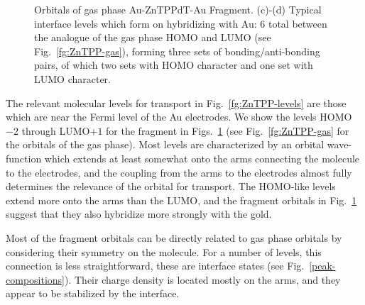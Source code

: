 \documentclass[aip,jcp,a4paper,reprint,floatfix,superscriptaddress]{revtex4-1}
\begin{document}
\begin{figure}
\caption{Orbitals of gas phase Au-ZnTPPdT-Au Fragment. (c)-(d) Typical interface levels which form on hybridizing with Au: 6 total between the analogue of the gas phase HOMO and LUMO (see Fig.~\ref{fg:ZnTPP-gas}), forming three sets of bonding/anti-bonding pairs, of which two sets with HOMO character and one set with LUMO character.}\label{fg:ZnTPP-frag}
\end{figure}


The relevant molecular levels for transport in Fig.~\ref{fg:ZnTPP-levels} are those which are near the Fermi level of the Au electrodes. We show the levels HOMO$-2$ through LUMO$+1$ for the fragment in Figs.~\ref{fg:ZnTPP-frag} (see Fig.~\ref{fg:ZnTPP-gas} for the orbitals of the gas phase). Most levels are characterized by an orbital wave-function which extends at least somewhat onto the arms connecting the molecule to the electrodes, and the coupling from the arms to the electrodes almost fully determines the relevance of the orbital for transport. The HOMO-like levels extend more onto the arms than the LUMO, and the fragment orbitals in Fig.~\ref{fg:ZnTPP-frag} suggest that they also hybridize more strongly with the gold.

Most of the fragment orbitals can be directly related to gas phase orbitals by considering their symmetry on the molecule. For a  number of levels, this connection is less straightforward, these are interface states (see Fig.~\ref{peak-compositions}).  
Their charge density is located mostly on the arms, and they appear to be stabilized by the interface.  
\end{document}

